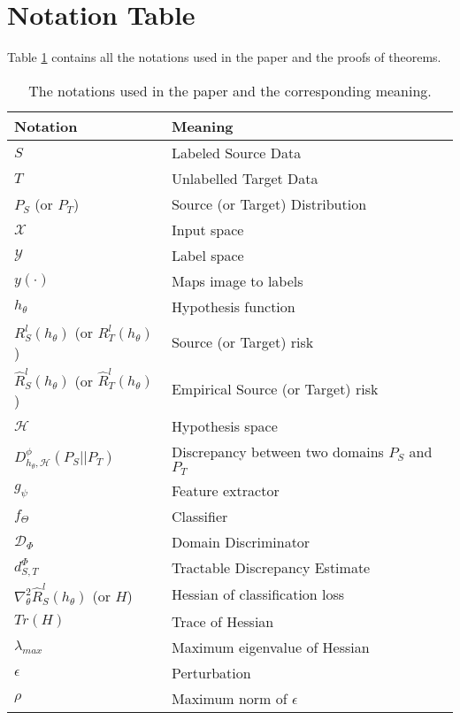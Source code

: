 \documentclass[table,dvipsnames]{article}
\theoremstyle{plain}
\theoremstyle{definition}
\theoremstyle{remark}
\begin{document}
\newpage
\appendix


\onecolumn


\section{Notation Table}
\label{app:notn_tab}
Table \ref{tab:notation} contains all the notations used in the paper and the proofs of theorems. 
\begin{table}[h!]
 \caption{The notations used in the paper and the corresponding meaning.}
    \centering
    \begin{tabular}{l|l}
    \hline
         \textbf{Notation} & \textbf{Meaning} \\
        \hline \hline
         $S$ & Labeled Source Data \\
         $T$ & Unlabelled Target Data \\
         $P_S$ (or $P_T$) & Source (or Target) Distribution \\
         $\mathcal{X}$ & Input space \\
         $\mathcal{Y}$ & Label space \\
         $y(\cdot)$ & Maps image to labels \\
         $h_\theta$ & Hypothesis function \\
         $R_S^l(h_\theta)$ (or $R_T^l(h_\theta)$) & Source (or Target) risk \\
         $\hat{R}_S^l(h_\theta)$ (or $\hat{R}_T^l(h_\theta)$) & Empirical Source (or Target) risk \\
         $\mathcal{H}$ & Hypothesis space \\
         $ D_{h_{\theta},\mathcal{H}}^\phi(P_S || P_T)$ & Discrepancy between two domains $P_S$ and $P_T$ \\
         $g_{\psi}$ & Feature extractor \\
         $f_{\Theta}$ & Classifier \\
         $\mathcal{D}_{\Phi}$ & Domain Discriminator \\
         $d_{S,T}^{\Phi}$ & Tractable Discrepancy Estimate\\
         $\nabla^2_{\theta} \hat{R}_S^l(h_{\theta})$ (or $H$) & Hessian of classification loss\\
         $Tr(H)$ & Trace of Hessian\\
         $\lambda_{max}$ & Maximum eigenvalue of Hessian\\
         $\epsilon$ & Perturbation \\
         $\rho$ & Maximum norm of $\epsilon$\\
         
    \end{tabular}
   
    \label{tab:notation}
\end{table}
\end{document}
